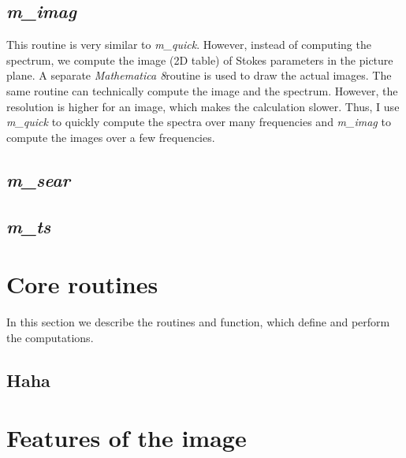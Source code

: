 \documentclass{emulateapj}
\newcommand{\mat}{\textit{Mathematica 8}}
\begin{document}
\subsection{\textit{m\_imag}}
This routine is very similar to \textit{m\_quick}. However, instead of computing the spectrum, we compute 
the image (2D table) of Stokes parameters in the picture plane. A separate \mat  routine is used to draw the actual images.
The same routine can technically compute the image and the spectrum.
However, the resolution is higher for an image, which makes the calculation slower. 
Thus, I use \textit{m\_quick} to quickly compute the spectra over many frequencies and \textit{m\_imag} to compute
the images over a few frequencies.
\subsection{\textit{m\_sear}}

\subsection{\textit{m\_ts}}

\section{Core routines}
In this section we describe the routines and function, which define and perform the computations.
\subsection{Haha}


\section{Features of the image}





\end{document}

